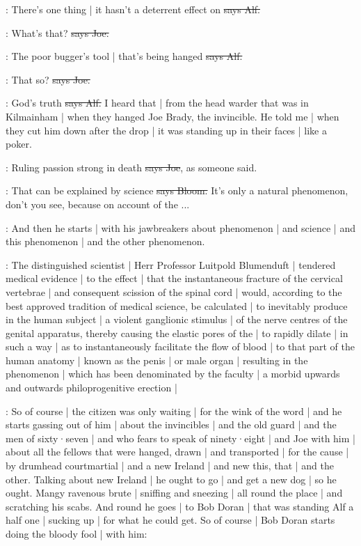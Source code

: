 \bergan:
There's one thing |
it hasn't a deterrent effect on
\sout{says Alf.}

\joe:
What's that?
\sout{says Joe.}

\bergan:
The poor bugger's tool |
that's being hanged
\sout{says Alf.}

\joe:
That so?
\sout{says Joe.}

\bergan:
God's truth
\sout{says Alf.}
I heard that |
from the head warder that was in Kilmainham |
when they hanged Joe Brady,
the invincible.
He told me |
when they cut him down after the drop |
it was standing up in their faces |
like a poker.

\joe:
Ruling passion strong in death
\sout{says Joe},
as someone said.

\Bloom:
That can be explained by science
\sout{says Bloom.}
It's only a natural phenomenon,
don't you see,
because on account of the ...

\Nq:
And then he starts |
with his jawbreakers about phenomenon |
and science |
and this phenomenon |
and the other phenomenon.

:
The distinguished scientist |
Herr Professor Luitpold Blumenduft |
tendered medical evidence |
to the effect |
that the instantaneous fracture of the cervical vertebrae |
and consequent scission of the spinal cord |
would,
according to the best approved tradition of medical science,
be calculated |
to inevitably produce in the human subject |
a violent ganglionic stimulus |
of the nerve centres of the genital apparatus,
thereby causing the elastic pores of the 
|
to rapidly dilate |
in such a way |
as to instantaneously facilitate the flow of blood |
to that part of the human anatomy |
known as the penis |
or male organ |
resulting in the phenomenon |
which has been denominated by the faculty |
a morbid upwards and outwards philoprogenitive erection |

\Nq:
So of course |
the citizen was only waiting |
for the wink of the word |
and he starts gassing out of him |
about the invincibles |
and the old guard |
and the men of sixty·seven |
and who fears to speak of ninety·eight |
and Joe with him |
about all the fellows that were hanged,
drawn |
and transported |
for the cause |
by drumhead courtmartial |
and a new Ireland |
and new this,
that |
and the other.
Talking about new Ireland |
he ought to go |
and get a new dog |
so he ought.
Mangy ravenous brute |
sniffing and sneezing |
all round the place |
and scratching his scabs.
And round he goes |
to Bob Doran |
that was standing Alf a half one |
sucking up |
for what he could get.
So of course |
Bob Doran starts doing the bloody fool |
with him:

